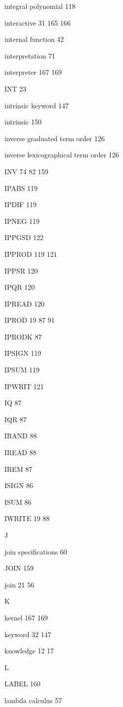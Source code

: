 \item integral polynomial 118
\item interactive  31  165 166
\item internal function 42
\item interpretation 71
\item interpreter  167 169
\item INT 23
\item intrinsic keyword 147
\item intrinsic 150
\item inverse graduated term order 126
\item inverse lexicographical term order 126
\item INV  74 82 159
\item IPABS 119
\item IPDIF 119
\item IPNEG 119
\item IPPGSD 122
\item IPPROD  119 121
\item IPPSR 120
\item IPQR 120
\item IPREAD 120
\item IPROD  19 87 91
\item IPRODK 87
\item IPSIGN 119
\item IPSUM 119
\item IPWRIT 121
\item IQ 87
\item IQR 87
\item IRAND 88
\item IREAD 88
\item IREM 87
\item ISIGN 86
\item ISUM 86
\item IWRITE  19 88
\indexspace
\item {\Large J}
\item join specifications 60
\item JOIN 159
\item join  21 56
\indexspace
\item {\Large K}
\item kernel  167 169
\item keyword   32  147
\item knowledge  12 17
\indexspace
\item {\Large L}
\item LABEL 160
\item lambda calculus 57
